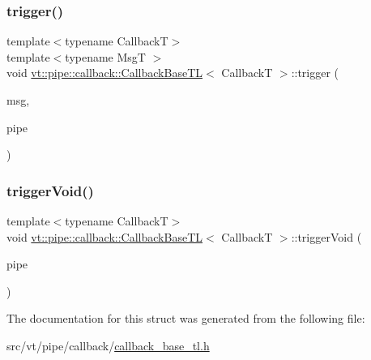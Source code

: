 \subsubsection{\texorpdfstring{trigger()}{trigger()}}
{\footnotesize\ttfamily template$<$typename CallbackT$>$ \\
template$<$typename MsgT $>$ \\
void \hyperlink{structvt_1_1pipe_1_1callback_1_1_callback_base_t_l}{vt\+::pipe\+::callback\+::\+Callback\+Base\+TL}$<$ CallbackT $>$\+::trigger (\begin{DoxyParamCaption}\item[{MsgT $\ast$}]{msg,  }\item[{\hyperlink{namespacevt_ac9852acda74d1896f48f406cd72c7bd3}{Pipe\+Type} const \&}]{pipe }\end{DoxyParamCaption})\hspace{0.3cm}{\ttfamily [inline]}}

\mbox{\label{structvt_1_1pipe_1_1callback_1_1_callback_base_t_l_a5d1658201aadd7363abf13a367c135b0}} 
\subsubsection{\texorpdfstring{trigger\+Void()}{triggerVoid()}}
{\footnotesize\ttfamily template$<$typename CallbackT$>$ \\
void \hyperlink{structvt_1_1pipe_1_1callback_1_1_callback_base_t_l}{vt\+::pipe\+::callback\+::\+Callback\+Base\+TL}$<$ CallbackT $>$\+::trigger\+Void (\begin{DoxyParamCaption}\item[{\hyperlink{namespacevt_ac9852acda74d1896f48f406cd72c7bd3}{Pipe\+Type} const \&}]{pipe }\end{DoxyParamCaption})\hspace{0.3cm}{\ttfamily [inline]}}



The documentation for this struct was generated from the following file\+:\begin{DoxyCompactItemize}
\item 
src/vt/pipe/callback/\hyperlink{callback__base__tl_8h}{callback\+\_\+base\+\_\+tl.\+h}\end{DoxyCompactItemize}
